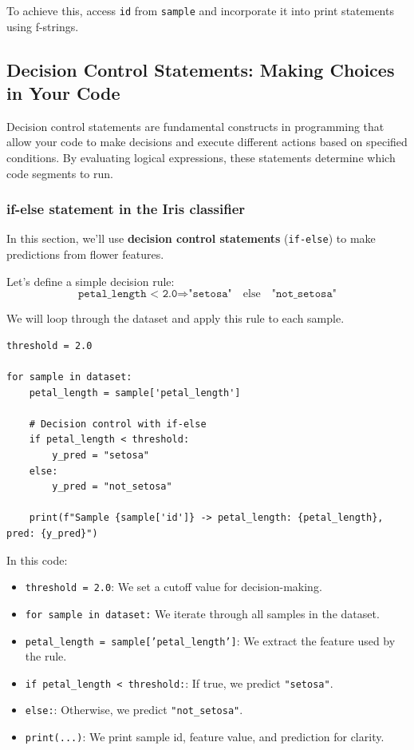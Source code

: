 To achieve this, access \texttt{id} from \texttt{sample} and incorporate it into print statements using f-strings.

\newpage
\subsection{Decision Control Statements: Making Choices in Your Code}

Decision control statements are fundamental constructs in programming that allow your code to make decisions and execute different actions based on specified conditions. By evaluating logical expressions, these statements determine which code segments to run.

\subsubsection{if-else statement in the Iris classifier}
In this section, we'll use \textbf{decision control statements} (\texttt{if-else}) to make predictions from flower features.

Let's define a simple decision rule:
\[
    \texttt{petal\_length < 2.0} \Rightarrow \texttt{"setosa"} \quad \text{else} \quad \texttt{"not\_setosa"}
\]

We will loop through the dataset and apply this rule to each sample.

\begin{verbatim}
threshold = 2.0

for sample in dataset:
    petal_length = sample['petal_length']

    # Decision control with if-else
    if petal_length < threshold:
        y_pred = "setosa"
    else:
        y_pred = "not_setosa"

    print(f"Sample {sample['id']} -> petal_length: {petal_length}, pred: {y_pred}")
\end{verbatim}

In this code:

\begin{itemize}
    \setlength{\itemsep}{0pt}
    \setlength{\parskip}{0pt}
    \item \texttt{threshold = 2.0}: We set a cutoff value for decision-making.
    \item \texttt{for sample in dataset:} We iterate through all samples in the dataset.
    \item \texttt{petal\_length = sample['petal\_length']}: We extract the feature used by the rule.
    \item \texttt{if petal\_length < threshold:}: If true, we predict \texttt{"setosa"}.
    \item \texttt{else:}: Otherwise, we predict \texttt{"not\_setosa"}.
    \item \texttt{print(...)}: We print sample id, feature value, and prediction for clarity.
\end{itemize}


